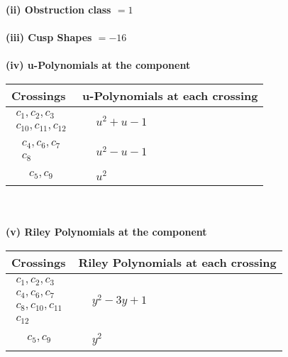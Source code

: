 \documentclass[1p]{elsarticle_modified}
\theoremstyle{definition}
\begin{document}
\flushleft \textbf{(ii) Obstruction class $= 1$}\\~\\
\flushleft \textbf{(iii) Cusp Shapes $= -16$}\\~\\
\newpage\renewcommand{\arraystretch}{1}
\flushleft \textbf{(iv) u-Polynomials at the component}\newline \\
\begin{tabular}{m{50pt}|m{274pt}}
Crossings & \hspace{64pt}u-Polynomials at each crossing \\
\hline $$\begin{aligned}c_{1},c_{2},c_{3}\\c_{10},c_{11},c_{12}\end{aligned}$$&$\begin{aligned}
&u^2+u-1
\end{aligned}$\\
\hline $$\begin{aligned}c_{4},c_{6},c_{7}\\c_{8}\end{aligned}$$&$\begin{aligned}
&u^2- u-1
\end{aligned}$\\
\hline $$\begin{aligned}c_{5},c_{9}\end{aligned}$$&$\begin{aligned}
&u^2
\end{aligned}$\\
\hline
\end{tabular}\\~\\
\newpage\renewcommand{\arraystretch}{1}
\flushleft \textbf{(v) Riley Polynomials at the component}\newline \\
\begin{tabular}{m{50pt}|m{274pt}}
Crossings & \hspace{64pt}Riley Polynomials at each crossing \\
\hline $$\begin{aligned}c_{1},c_{2},c_{3}\\c_{4},c_{6},c_{7}\\c_{8},c_{10},c_{11}\\c_{12}\end{aligned}$$&$\begin{aligned}
&y^2-3 y+1
\end{aligned}$\\
\hline $$\begin{aligned}c_{5},c_{9}\end{aligned}$$&$\begin{aligned}
&y^2
\end{aligned}$\\
\hline
\end{tabular}\\~\\
\end{document}
